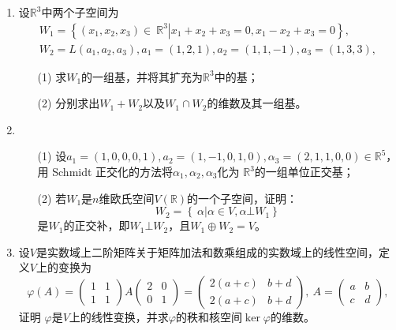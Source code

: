 \begin{enumerate}
    \item 设\(\mathbb{R}^3\)中两个子空间为
          \begin{align*}
              W_1 = \left\{ \left( x_1,x_2,x_3 \right) \in \left. \ \mathbb{R}^3 \right|x_1 + x_2 + x_3 = 0,x_1 - x_2 + x_3 = 0 \right\}, \\
              W_2 = L\left( a_1,a_2,a_3 \right),a_1 = (1,2,1),a_2 = (1,1, - 1),a_3 = (1,3,3),
          \end{align*}
          \begin{enumerate}
              \item[(1)] 求\(W_1\)的一组基，并将其扩充为\(\mathbb{R}^3\)中的基；
              \item[(2)] 分别求出\(W_1 + W_2\)以及\(W_1 \cap W_2\)的维数及其一组基。
          \end{enumerate}

    \item
          \begin{enumerate}
              \item[(1)] 设\(a_1 = (1,0,0,0,1),a_2 = (1, - 1,0,1,0),\alpha_3 = (2,1,1,0,0) \in \mathbb{R}^{5}\)，用
                    Schmidt 正交化的方法将\(\alpha_1,\alpha_2,\alpha_3\)化为
                    \(\mathbb{R}^3\)的一组单位正交基；
              \item[(2)] 若\(W_1\)是\(n\)维欧氏空间\(V\left( \mathbb{R} \right)\)的一个子空间，证明：
                    \[W_2 = \left\{ \left. \ \alpha \right|\alpha \in V,\alpha\bot W_1 \right\}\]
                    是\(W_1\)的正交补，即\(W_1\bot W_2\)，且\(W_1 \oplus W_2 = V\)。
          \end{enumerate}

    \item 设\(V\)是实数域上二阶矩阵关于矩阵加法和数乘组成的实数域上的线性空间，定义\(V\)上的变换为
          \[\varphi(A) =
              \begin{pmatrix}
                  1 & 1 \\
                  1 & 1
              \end{pmatrix} A \begin{pmatrix}
                  2 & 0 \\
                  0 & 1
              \end{pmatrix} = \begin{pmatrix}
                  2(a + c) & b + d \\
                  2(a + c) & b + d
              \end{pmatrix},\ A = \begin{pmatrix}
                  a & b \\
                  c & d
              \end{pmatrix},\]
          证明 \(\varphi\)是\(V\)上的线性变换，并求\(\varphi\)的秩和核空间\(\ker\varphi\)的维数。



\end{enumerate}
